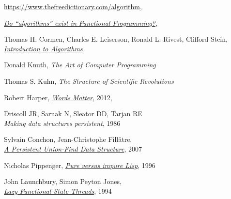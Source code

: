 \documentclass[declaration,mgr,english,shortabstract]{iithesis}
\begin{document}
\begin{thebibliography}{1}

    \url{https://www.thefreedictionary.com/algorithm}, \\

    \href{https://stackoverflow.com/questions/25940327/do-algorithms-exist-in-functional-programming}{\textit{Do ``algorithms'' exist in Functional Programming?}}, \\
    

    Thomas H. Cormen, Charles E. Leiserson, Ronald L. Rivest, Clifford Stein, \\
    \href{http://ressources.unisciel.fr/algoprog/s00aaroot/aa00module1/res/%5BCormen-AL2011%5DIntroduction_To_Algorithms-A3.pdf}{\textit{Introduction to Algorithms}}

    Donald Knuth,
    \textit{The Art of Computer Programming}

    Thomas S. Kuhn,
    \textit{The Structure of Scientific Revolutions}

    Robert Harper,
    \href{https://existentialtype.wordpress.com/2012/02/01/words-matter/}{\textit{Words Matter}}, 2012, \\

    Driscoll JR, Sarnak N, Sleator DD, Tarjan RE \\
    \textit{Making data structures persistent}, 1986

    Sylvain Conchon, Jean-Christophe Fillâtre, \\
    \href{https://www.lri.fr/~filliatr/ftp/publis/puf-wml07.pdf}{\textit{A Persistent Union-Find Data Structure}}, 2007

    Nicholas Pippenger,
    \href{https://www.cs.princeton.edu/courses/archive/fall03/cs528/handouts/Pure%20Versus%20Impure%20LISP.pdf}{\textit{Pure versus impure Lisp}}, 1996

    John Launchbury, Simon Peyton Jones, \\
    \href{https://www.microsoft.com/en-us/research/wp-content/uploads/1994/06/lazy-functional-state-threads.pdf}{\textit{Lazy Functional State Threads}}, 1994


\end{thebibliography}
\end{document}
